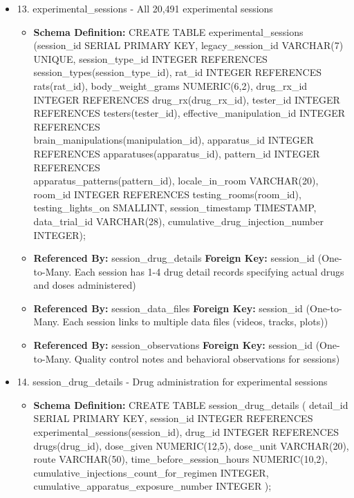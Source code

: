 \documentclass[12pt, titlepage]{article}
\begin{document}
\begin{itemize}
\item 13. experimental\_sessions - All 20,491 experimental sessions
\begin{itemize}
	\item{\textbf{Schema Definition: }CREATE TABLE experimental\_sessions (session\_id SERIAL PRIMARY KEY, legacy\_session\_id VARCHAR(7)
	      UNIQUE, session\_type\_id INTEGER REFERENCES session\_types(session\_type\_id), rat\_id INTEGER
	      REFERENCES rats(rat\_id), body\_weight\_grams NUMERIC(6,2), drug\_rx\_id INTEGER REFERENCES
	      drug\_rx(drug\_rx\_id), tester\_id INTEGER REFERENCES testers(tester\_id), effective\_manipulation\_id
	      INTEGER REFERENCES \\ brain\_manipulations(manipulation\_id), apparatus\_id INTEGER REFERENCES
	      apparatuses(apparatus\_id), pattern\_id INTEGER REFERENCES \\ apparatus\_patterns(pattern\_id),
	      locale\_in\_room VARCHAR(20), room\_id INTEGER REFERENCES testing\_rooms(room\_id),
	      testing\_lights\_on SMALLINT, session\_timestamp TIMESTAMP, data\_trial\_id VARCHAR(28),
	      cumulative\_drug\_injection\_number INTEGER);
	      }
	\item{\textbf{Referenced By: }session\_drug\_details \textbf{Foreign Key: } session\_id (One-to-Many. Each session has 1-4 drug detail records specifying actual drugs and doses administered)}
	\item{\textbf{Referenced By: }session\_data\_files \textbf{Foreign Key: }  session\_id (One-to-Many. Each session links to multiple data files (videos, tracks, plots))}
	\item{\textbf{Referenced By: }session\_observations \textbf{Foreign Key: }  session\_id (One-to-Many. Quality control notes and behavioral observations for sessions)}
\end{itemize}
\item 14. session\_drug\_details - Drug administration for experimental sessions

\begin{itemize}
	\item{\textbf{Schema Definition: }CREATE TABLE session\_drug\_details (
	      detail\_id SERIAL PRIMARY KEY,
	      session\_id INTEGER REFERENCES experimental\_sessions(session\_id),
	      drug\_id INTEGER REFERENCES drugs(drug\_id),
	      dose\_given NUMERIC(12,5),
	      dose\_unit VARCHAR(20),
	      route VARCHAR(50),
	      time\_before\_session\_hours NUMERIC(10,2),
	      cumulative\_injections\_count\_for\_regimen INTEGER,
	      \\ cumulative\_apparatus\_exposure\_number INTEGER
	      );
	      }
\end{itemize}


\end{itemize}
\end{document}
